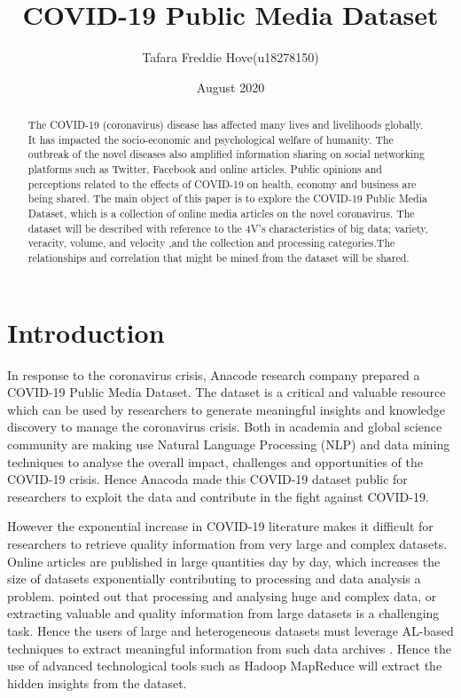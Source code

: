 \documentclass[conference]{IEEEtran}
\title{COVID-19 Public Media Dataset}
\author{Tafara Freddie Hove(u18278150)}
\date{August 2020}
\begin{document}
\maketitle
\begin{abstract}
  The COVID-19 (coronavirus) disease has affected many lives and livelihoods globally. It has impacted the socio-economic and psychological welfare of humanity.  The outbreak of the novel diseases also amplified information sharing on social networking platforms such as Twitter, Facebook and online articles. Public opinions and perceptions related to the effects of COVID-19 on health, economy and  business are being shared. The main object of this paper is to explore the COVID-19 Public Media Dataset, which is a collection of online media articles on the novel coronavirus. The dataset will be described with reference to the 4V's characteristics of big data; variety, veracity, volume, and velocity ,and the collection and processing categories.The relationships and correlation that might be mined from the dataset will be shared.
\end{abstract}

\section{Introduction}
In response to the coronavirus crisis, Anacode research company prepared a COVID-19 Public Media Dataset.  The dataset is a critical and valuable resource which can be used by researchers to generate meaningful insights and knowledge discovery to manage the coronavirus crisis. Both in academia and global science community are making use Natural Language Processing (NLP) and data mining techniques to analyse the overall impact, challenges and opportunities of the COVID-19 crisis. Hence Anacoda made this COVID-19 dataset public for researchers to exploit the data and contribute in the fight against COVID-19. 

However the exponential increase in COVID-19 literature makes it difficult for 
 researchers to retrieve quality information from very large and complex datasets. Online articles are published in large quantities day by day, which increases the size of datasets exponentially contributing to processing and data analysis a problem. \cite{Patel et al} pointed out that processing and analysing huge and complex data, or extracting valuable and quality information from large datasets is a challenging task. Hence the users of large and heterogeneous datasets must leverage AL-based techniques to extract meaningful information from such data archives \cite{Wang et al}. Hence the use of advanced technological tools such as Hadoop MapReduce will extract the hidden insights from the dataset. 
\end{document}

